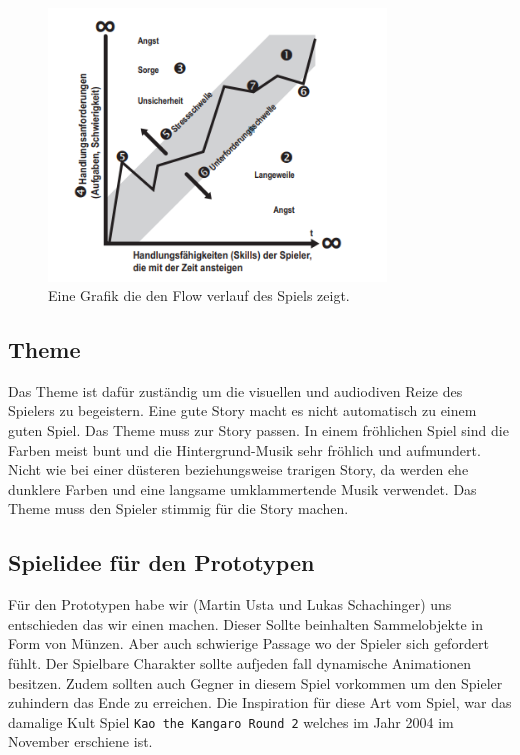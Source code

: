 \begin{figure}[H]
    \centering
    \includegraphics[width=0.8\textwidth]{chapters/15/images/GameFlow.png}
    \caption{Eine Grafik die den Flow verlauf des Spiels zeigt.}
    \label{UST-4}
\end{figure}


\subsection{Theme}
Das Theme ist dafür zuständig um die visuellen und audiodiven Reize des Spielers zu begeistern. Eine gute Story macht es nicht automatisch zu einem guten Spiel. Das Theme muss zur Story passen. In einem fröhlichen Spiel sind die Farben meist bunt und die Hintergrund-Musik sehr fröhlich und aufmundert. Nicht wie bei einer düsteren beziehungsweise trarigen Story, da werden ehe dunklere Farben und eine langsame umklammertende Musik verwendet. Das Theme muss den Spieler stimmig für die Story machen.

\subsection{Spielidee für den Prototypen}
Für den Prototypen habe wir (Martin Usta und Lukas Schachinger) uns entschieden das wir einen  machen. Dieser Sollte beinhalten Sammelobjekte in Form von Münzen. Aber auch schwierige Passage wo der Spieler sich gefordert fühlt. Der Spielbare Charakter sollte aufjeden fall dynamische Animationen besitzen. Zudem sollten auch Gegner in diesem Spiel vorkommen um den Spieler zuhindern das Ende zu erreichen. Die Inspiration für diese Art vom Spiel, war das damalige Kult Spiel \verb+Kao the Kangaro Round 2+ welches im Jahr 2004 im November erschiene ist.\\\\

